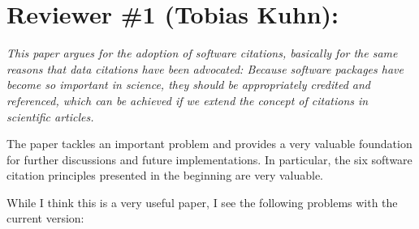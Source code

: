 \documentclass{article}
\begin{document}

\section*{Reviewer \#1 (Tobias Kuhn):}

{\itshape
This paper argues for the adoption of software citations, basically for the same reasons that data citations have been advocated: Because software packages have become so important in science, they should be appropriately credited and referenced, which can be achieved if we extend the concept of citations in scientific articles.

The paper tackles an important problem and provides a very valuable foundation for further discussions and future implementations. In particular, the six software citation principles presented in the beginning are very valuable.

While I think this is a very useful paper, I see the following problems with the current version:
}
\end{document}
